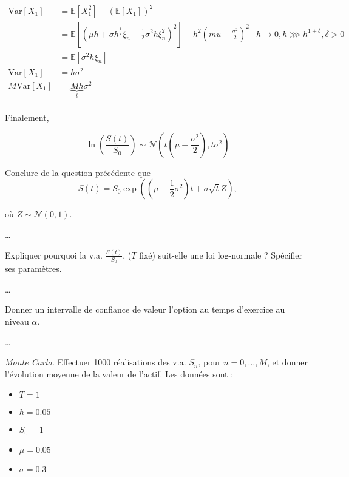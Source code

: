 \documentclass[answers, 10pt]{exam}
\begin{document}
\begin{questions}
\begin{solutionorbox}
		\begin{align*}
			\text{Var}\left[X_1 \right] &= \mathbb{E}\left[X_1^2 \right] - \left( \mathbb{E}\left[X_1 \right] \right)^2\\
						    &= \mathbb{E}\left[\left(\mu h + \sigma h^{\frac{1}{2}} \xi_n - \frac{1}{2} \sigma^2 h \xi_n^2 \right)^2 \right] - h^2 \left( mu - \frac{\sigma^2}{2} \right)^2 & h\to 0, h\ggg h^{1 + \delta}, \delta > 0\\
						    &= \mathbb{E}\left[\sigma^2 h \xi_n \right]\\
			\text{Var}\left[X_1 \right] &= h\sigma^2\\
			M \text{Var}\left[X_1 \right] &= \underbrace{Mh}_{t}\sigma^2\\
		\end{align*}	

		Finalement,

		\begin{equation*}
			\ln \left( \frac{S(t)}{S_0} \right)\sim \mathcal{N} \left( t \left( \mu - \frac{\sigma^2}{2}\right), t \sigma^2\right)
		\end{equation*}

	\end{solutionorbox}

	\question
	Conclure de la question précédente que
	\begin{equation*}
		S(t) = S_0 \exp \left(  \left(  \mu - \frac{1}{2}\sigma^2 \right)t + \sigma \sqrt{
		t}Z \right),
	\end{equation*}

	où $Z\sim \mathcal{N}(0, 1)$.
	
	\begin{solutionorbox}
		\dots
	\end{solutionorbox}

	\question
	Expliquer pourquoi la v.a. $\frac{S(t)}{S_0}$, ($T$ fixé) suit-elle une
	loi log-normale ? Spécifier ses paramètres.
	
	\begin{solutionorbox}
		\dots
	\end{solutionorbox}

	\question
	Donner un intervalle de confiance de valeur l'option au temps
	d'exercice au niveau $\alpha$.

	\begin{solutionorbox}
		\dots
	\end{solutionorbox}

	\question
	
	\textit{Monte Carlo.} Effectuer 1000 réalisations des v.a. $S_n$, pour
	$n=0,\dots,M$, et donner l'évolution moyenne de la valeur de l'actif.
	Les données sont : 
	
	\begin{itemize}
		\item $T=1$
		\item $h = 0.05$
		\item $S_0 = 1$
		\item $\mu = 0.05$
		\item $ \sigma = 0.3$
	\end{itemize}

\end{questions}
\end{document}
